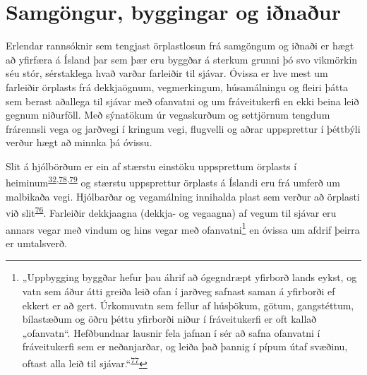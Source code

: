 \documentclass[icelandic,]{book}
\let\rmarkdownfootnote\footnote%
\def\footnote{\protect\rmarkdownfootnote}
\begin{document}
\hypertarget{samgongur-byggingar-og-inaur}{%
\section*{Samgöngur, byggingar og iðnaður}\label{samgongur-byggingar-og-inaur}}

Erlendar rannsóknir sem tengjast örplastlosun frá samgöngum og iðnaði er hægt að yfirfæra á Ísland þar sem þær eru byggðar á sterkum grunni þó svo vikmörkin séu stór, sérstaklega hvað varðar farleiðir til sjávar. Óvissa er hve mest um farleiðir örplasts frá dekkjaögnum, vegmerkingum, húsamálningu og fleiri þátta sem berast aðallega til sjávar með ofanvatni og um fráveitukerfi en ekki beina leið gegnum niðurföll. Með sýnatökum úr vegaskurðum og settjörnum tengdum frárennsli vega og jarðvegi í kringum vegi, flugvelli og aðrar uppsprettur í þéttbýli verður hægt að minnka þá óvissu. 

Slit á hjólbörðum er ein af stærstu einstöku uppsprettum örplasts í heiminum\textsuperscript{\protect\hyperlink{ref-sundt2014sources}{32},\protect\hyperlink{ref-lassen2015microplastics}{78},\protect\hyperlink{ref-essel2015sources}{79}} og stærstu uppsprettur örplasts á Íslandi eru frá umferð um malbikaða vegi. Hjólbarðar og vegamálning innihalda plast sem verður að örplasti við slit\textsuperscript{\protect\hyperlink{ref-kreider2010physical}{76}}. Farleiðir dekkjaagna (dekkja- og vegaagna) af vegum til sjávar eru annars vegar með vindum og hins vegar með ofanvatni\footnote{„Uppbygging byggðar hefur þau áhrif að ógegndræpt yfirborð lands eykst, og vatn sem áður átti greiða leið ofan í jarðveg safnast saman á yfirborði ef ekkert er að gert. Úrkomuvatn sem fellur af húsþökum, götum, gangstéttum, bílastæðum og öðru þéttu yfirborði niður í fráveitukerfi er oft kallað „ofanvatn``. Hefðbundnar lausnir fela jafnan í sér að safna ofanvatni í fráveitukerfi sem er neðanjarðar, og leiða það þannig í pípum útaf svæðinu, oftast alla leið til sjávar.``\textsuperscript{\protect\hyperlink{ref-StefanFreyr}{77}}} en óvissa um afdrif þeirra er umtalsverð.
\end{document}
